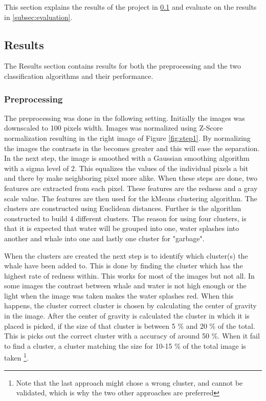 This section explains the results of the project in \ref{subsec:results} and evaluate on the results in \ref{subsec:evaluation}.

\subsection{Results}
\label{subsec:results}
The Results section contains results for both the preprocessing and the two classification algorithms and their performance.


\subsubsection{Preprocessing}
The preprocessing was done in the following setting.
Initially the images was downscaled to 100 pixels width.
Images was normalized using Z-Score normalization resulting in the right image of Figure \ref{fig:step1}. By normalizing the images the contrasts in the becomes greater and this will ease the separation.
In the next step, the image is smoothed with a Gaussian smoothing algorithm with a sigma level of 2. This equalizes the values of the individual pixels a bit and there by make neighboring pixel more alike.
When these steps are done, two features are extracted from each pixel.
These features are the redness and a gray scale value.
The features are then used for the kMeans clustering algorithm.
The clusters are constructed using Euclidean distances. Further is the algorithm constructed to build 4 different clusters.
The reason for using four clusters, is that it is expected that water will be grouped into one, water splashes into another and whale into one and lastly one cluster for "garbage". 

When the clusters are created the next step  is to identify which cluster(s) the whale have been added to.
This is done by finding the cluster which has the highest rate of redness within. This works for most of the images but not all. In some images the contrast between whale and water is not high enough or the light when the image was taken makes the water splashes red. When this happens, the cluster correct cluster is chosen by calculating the center of gravity in the image. After the center of gravity is calculated the cluster in which it is placed is picked, if the size of that cluster is between 5 \% and 20 \% of the total. This is picks out the correct cluster with a accuracy of around 50 \%.
When it fail to find a cluster, a cluster matching the size for 10-15 \% of the total image is taken \footnote{Note that the last approach might chose a wrong cluster, and cannot be validated, which is why the two other approaches are preferred}. 

